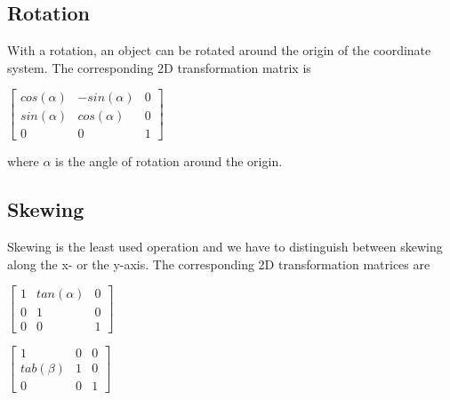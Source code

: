 \subsection{Rotation}
With a rotation, an object can be rotated around the origin of the coordinate system.
The corresponding 2D transformation matrix is

\hspace*{0.4cm}
\begin{center}
\begin{math}\left[ \begin{array}{ccc} cos(\alpha) & -sin(\alpha) & 0 \\ sin(\alpha) & cos(\alpha) & 0 \\ 0 & 0 & 1\end{array}\right]\end{math}
\end{center}
\hspace*{0.4cm}

where $\alpha$ is the angle of rotation around the origin.

\subsection{Skewing}
Skewing is the least used operation and we have to distinguish between skewing along the x- or the y-axis.
The corresponding 2D transformation matrices are

\hspace*{0.4cm}
\begin{center}
\begin{math}\left[ \begin{array}{ccc} 1 & tan(\alpha) & 0 \\ 0 & 1 & 0 \\ 0 & 0 & 1\end{array}\right]\end{math}
\end{center}
\hspace*{0.4cm}


\hspace*{0.4cm}
\begin{center}
\begin{math}\left[ \begin{array}{ccc} 1 & 0 & 0 \\ tab(\beta) & 1 & 0 \\ 0 & 0 & 1\end{array}\right]\end{math}
\end{center}
\hspace*{0.4cm}

